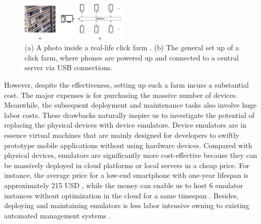 \documentclass[conference]{IEEEtranl}
\begin{document}




	\begin{figure}[b]
	\begin{center}
	\includegraphics[width=0.44\textwidth]{Figures/clickfarm}
	\caption{(a) A photo inside a real-life click farm \cite{clickphoto}. (b) The general set up of a click farm, where phones are powered up and connected to a central server via USB connections. }
	\label{fig:clickfarm}
	\end{center}
	\end{figure}
	However, despite the effectiveness, 
	setting up such a farm incurs a substantial cost. The major expenses is for purchasing the massive number of devices. Meanwhile, the subsequent deployment and maintenance tasks also involve huge labor costs.
	These drawbacks naturally inspire us to investigate the potential of replacing the physical devices with device emulators. Device emulators are in essence virtual machines that are mainly designed for developers to swiftly prototype mobile applications without using hardware devices. Compared with physical devices, emulators are significantly more cost-effective because they can be massively deployed in cloud platforms or local servers in a cheap price. For instance, the average price for a low-end smartphone with one-year lifespan is approximately 215 USD \cite{pricesmartphone}, while the money can enable us to host 6 emulator instances without optimization in the cloud for a same timespan \cite{vpscom}. Besides, deploying and maintaining emulators is less labor intensive owning to existing automated management systems \cite{mutti2015baredroid}.
\end{document}
